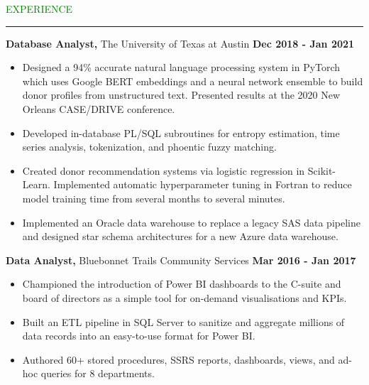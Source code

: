 \documentclass [
        11pt
] {article}
\begin{document}

\noindent\textcolor{green}{EXPERIENCE \rule{15.8cm}{1pt}}

\vspace*{10pt}

\noindent \textbf {Database Analyst,} The University of Texas at Austin
\hspace*{\fill} \textbf {Dec 2018 - Jan 2021}


\begin{itemize}[itemsep=1pt,topsep=1pt]
\renewcommand{\labelitemi}{\scriptsize$\blacksquare$}

\item Designed a 94\% accurate natural language processing system in PyTorch
which uses Google BERT embeddings and a neural network ensemble to build donor
profiles from unstructured text. Presented results at the 2020 New Orleans
CASE/DRIVE conference.

\item Developed in-database PL/SQL subroutines for entropy estimation,
time series analysis, tokenization, and phoentic fuzzy matching.

\item Created donor recommendation systems via logistic regression in Scikit-Learn.
Implemented automatic hyperparameter tuning in Fortran to reduce model training 
time from several months to several minutes.

\item Implemented an Oracle data warehouse to replace a legacy SAS data pipeline
and designed star schema architectures for a new Azure data warehouse.

\end{itemize}

\vspace*{5pt}

\noindent \textbf {Data Analyst,} Bluebonnet Trails Community Services
\hspace*{\fill} \textbf {Mar 2016 - Jan 2017}


\begin{itemize}[itemsep=1pt,topsep=1pt]
\renewcommand{\labelitemi}{\scriptsize$\blacksquare$}


\item Championed the introduction of Power BI dashboards to the C-suite 
and board of directors as a simple tool for on-demand visualisations and KPIs. 

\item Built an ETL pipeline in SQL Server to sanitize and aggregate
millions of data records into an easy-to-use format for Power BI.

\item Authored 60+ stored procedures, SSRS reports, dashboards, views, 
and ad-hoc queries for 8 departments.

\end{itemize}
\end{document}
